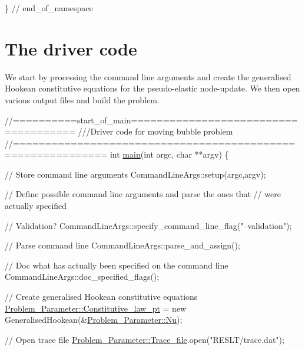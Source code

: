 \begin{DoxyCodeInclude}
 \} \textcolor{comment}{// end\_of\_namespace}

\end{DoxyCodeInclude}




 

\hypertarget{index_main}{}\section{The driver code}\label{index_main}
We start by processing the command line arguments and create the generalised Hookean constitutive equations for the pseudo-\/elastic node-\/update. We then open various output files and build the problem.


\begin{DoxyCodeInclude}
\textcolor{comment}{//==========start\_of\_main=====================================}
\textcolor{comment}{///Driver code for moving bubble problem}
\textcolor{comment}{}\textcolor{comment}{//============================================================}
\textcolor{keywordtype}{int} \hyperlink{adaptive__bubble__in__channel_8cc_a3c04138a5bfe5d72780bb7e82a18e627}{main}(\textcolor{keywordtype}{int} argc, \textcolor{keywordtype}{char} **argv)
\{
  
 \textcolor{comment}{// Store command line arguments}
 CommandLineArgs::setup(argc,argv);

 \textcolor{comment}{// Define possible command line arguments and parse the ones that}
 \textcolor{comment}{// were actually specified}
 
 \textcolor{comment}{// Validation?}
 CommandLineArgs::specify\_command\_line\_flag(\textcolor{stringliteral}{"--validation"});

 \textcolor{comment}{// Parse command line}
 CommandLineArgs::parse\_and\_assign(); 
 
 \textcolor{comment}{// Doc what has actually been specified on the command line}
 CommandLineArgs::doc\_specified\_flags();

 \textcolor{comment}{// Create generalised Hookean constitutive equations}
 \hyperlink{namespaceProblem__Parameter_a810f05c8d3e3331aed75643557d1057c}{Problem\_Parameter::Constitutive\_law\_pt} = 
  \textcolor{keyword}{new} GeneralisedHookean(&\hyperlink{namespaceProblem__Parameter_abec2e733c8f2d3c18ebc702b3f80cc17}{Problem\_Parameter::Nu});
 
 \textcolor{comment}{// Open trace file}
 \hyperlink{namespaceProblem__Parameter_a55310be5f2dfcb5fcfe35d71f9c16e06}{Problem\_Parameter::Trace\_file}.open(\textcolor{stringliteral}{"RESLT/trace.dat"}); 


\end{DoxyCodeInclude}
